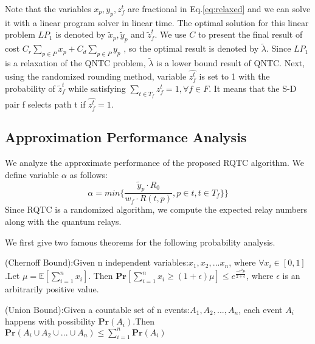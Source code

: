 Note that the variables $x_p, y_p, z_f^t$ are fractional in Eq.\ref{eq:relaxed} and we can solve it with a linear program solver in linear time. The optimal solution for this linear problem $LP_1$ is denoted by $\widetilde{x}_p,\widetilde{y}_p$ and $\widetilde{z}_f^t$. We use $C$ to present the final result of cost $C_r\sum_{p \in P}{x_p} + C_d \sum_{p \in P}{y_p}$ , so the optimal result is denoted by $\widetilde{\lambda}$. Since $LP_1$ is a relaxation of the QNTC problem, $\widetilde{\lambda}$ is a lower bound result of QNTC. Next, using the randomized rounding method, variable $\hat{z_f^t}$ is set to 1 with the probability of $\widetilde{z}_f^t$ while satisfying $\sum_{t \in T_f}{z_f^t} = 1, \forall f \in F$. It means that the S-D pair f selects path t if $\hat{z_f^t} = 1$.

\subsection{Approximation Performance Analysis}
We analyze the approximate performance of the proposed RQTC algorithm. We define variable $\alpha$ as follows:
\begin{equation}\label{alpha}
  \alpha = min\{\frac{\widetilde{y}_p \cdot R_0}{w_f \cdot R(t,p)},p \in t,t \in T_f\}\}
\end{equation}
Since RQTC is a randomized algorithm, we compute the expected relay numbers along with the quantum relays.


We first give two famous theorems for the following probability analysis.
\begin{lemma}\label{chernoff}
(Chernoff Bound):Given n independent variables:$x_1,x_2,...x_n$, where $\forall x_i \in [0,1]$.Let $\mu = \mathbb{E}[\sum_{i=1}^{n}x_i]$. Then $\textbf{Pr}[\sum_{i=1}^{n}x_i \ge (1+\epsilon)\mu] \le e^{\frac{-\epsilon^2\mu}{2+\epsilon}}$, where $\epsilon$ is an arbitrarily positive value.
\end{lemma}

\begin{lemma}\label{unionbound}
(Union Bound):Given a countable set of n events:$A_1,A_2,...,A_n$, each event $A_i$ happens with possibility $\textbf{Pr}(A_i)$.Then $\textbf{Pr}(A_i \cup A_2 \cup... \cup A_n) \le \sum_{i=1}^{n}\textbf{Pr}(A_i)$
\end{lemma}


